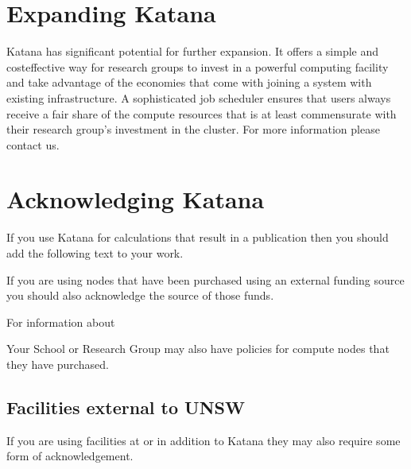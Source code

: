 \documentclass[letterpaper,10pt,english]{sphinxmanual}
\begin{document}
\section{Expanding Katana}
\label{\detokenize{faq:expanding-katana}}
Katana has significant potential for further expansion. It offers a simple and cost\sphinxhyphen{}effective way for research groups to invest in a powerful computing facility and take advantage of the economies that come with joining a system with existing infrastructure. A sophisticated job scheduler ensures that users always receive a fair share of the compute resources that is at least commensurate with their research group’s investment in the cluster. For more information please contact us.


\section{Acknowledging Katana}
\label{\detokenize{faq:acknowledging-katana}}
If you use Katana for calculations that result in a publication then you should add the following text to your work.

\begin{sphinxVerbatim}[commandchars=\\\{\}]
                
\end{sphinxVerbatim}

If you are using nodes that have been purchased using an external funding source you should also acknowledge the source of those funds.

For information about 

Your School or Research Group may also have policies for compute nodes that they have purchased.


\subsection{Facilities external to UNSW}
\label{\detokenize{faq:facilities-external-to-unsw}}
If you are using facilities at  or  in addition to Katana they may also require some form of acknowledgement.
\end{document}
